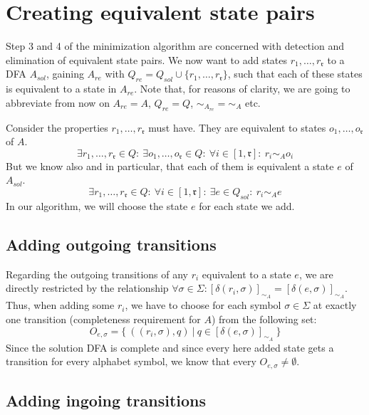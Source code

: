 \section{Creating equivalent state pairs}

Step 3 and 4 of the minimization algorithm are concerned with detection and elimination of equivalent state pairs. We now want to add states $r_1,\ldots,r_\mathfrak{r}$ to a DFA $A_{sol}$, gaining $A_{re}$ with $Q_{re} = Q_{sol} \cup \{r_1,\ldots,r_\mathfrak{r}\}$, such that each of these states is equivalent to a state in $A_{re}$. Note that, for reasons of clarity, we are going to abbreviate from now on $A_{re} = A$, $Q_{re} = Q$, $\sim_{A_{re}} = \sim_A$ etc.


Consider the properties $r_1,\ldots,r_\mathfrak{r}$ must have. They are equivalent to states $o_1,\ldots,o_\mathfrak{r}$ of $A$.
\[
\exists r_1,\ldots,r_\mathfrak{r} \in Q\colon\ \exists o_1,\ldots,o_\mathfrak{r} \in Q\colon\ \forall i \in [1,\mathfrak{r}] \colon\ r_i \sim_A o_i
\]
But we know also and in particular, that each of them is equivalent a state $e$ of $A_{sol}$.
\[
	\exists r_1,\ldots,r_\mathfrak{r} \in Q\colon\ \forall i \in [1,\mathfrak{r}] \colon\ \exists e \in Q_{sol}\colon\ r_i \sim_A e
\]
In our algorithm, we will choose the state $e$ for each state we add.

\subsection{Adding outgoing transitions}

Regarding the outgoing transitions of any $r_i$ equivalent to a state $e$, we are directly restricted by the relationship $\forall \sigma \in \Sigma \colon [\delta(r_i, \sigma)]_{\sim_A} = [\delta(e, \sigma)]_{\sim_A}$. Thus, when adding some $r_i$, we have to choose for each symbol $\sigma \in \Sigma$ at exactly one transition (completeness requirement for $A$) from the following set:
\[
	O_{e,\sigma} = \{\ ((r_i, \sigma), q)\ |\ q \in [\delta(e, \sigma)]_{\sim_A}\ \}
\]
Since the solution DFA is complete and since every here added state gets a transition for every alphabet symbol, we know that every $O_{e,\sigma} \neq \emptyset$.


\subsection{Adding ingoing transitions}

